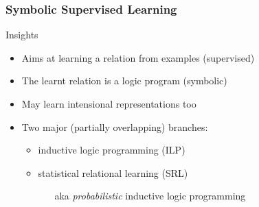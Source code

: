 \documentclass[presentation]{beamer}\mode<presentation>{\usetheme{AMSBolognaFC}}
\begin{document}
\begin{frame}[allowframebreaks]
\frametitle{Symbolic Supervised Learning}

    \begin{block}{Insights}
        \begin{itemize}
            \item Aims at learning a \alert{relation from examples} (supervised)
            \item The learnt relation is a \alert{logic program} (symbolic)
            \item May learn \alert{intensional} representations too
            \item Two major (partially overlapping) branches:
            \begin{itemize}
                \item inductive logic programming (ILP)
                \item statistical relational learning (SRL)
                \begin{itemize}
                    \item[aka] \emph{probabilistic} inductive logic programming
                \end{itemize}
            \end{itemize}
        \end{itemize}
    \end{block}


\end{frame}
\end{document}
